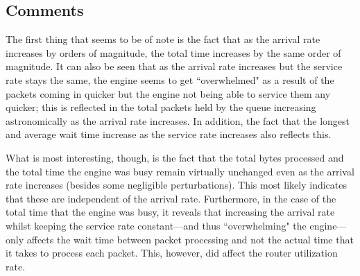 \documentclass{article}
\begin{document}
\subsection{Comments}

The first thing that seems to be of note is the fact that as the arrival rate increases by orders of magnitude, the total time increases by the same order of magnitude. It can also be seen that as the arrival rate increases but the service rate stays the same, the engine seems to get ``overwhelmed" as a result of the packets coming in quicker but the engine not being able to service them any quicker; this is reflected in the total packets held by the queue increasing astronomically as the arrival rate increases. In addition, the fact that the longest and average wait time increase as the service rate increases also reflects this.

What is most interesting, though, is the fact that the total bytes processed and the total time the engine was busy remain virtually unchanged even as the arrival rate increases (besides some negligible perturbations). This most likely indicates that these are independent of the arrival rate. Furthermore, in the case of the total time that the engine was busy, it reveals that increasing the arrival rate whilst keeping the service rate constant—and thus ``overwhelming" the engine—only affects the wait time between packet processing and not the actual time that it takes to process each packet. This, however, did affect the router utilization rate.
\end{document}
